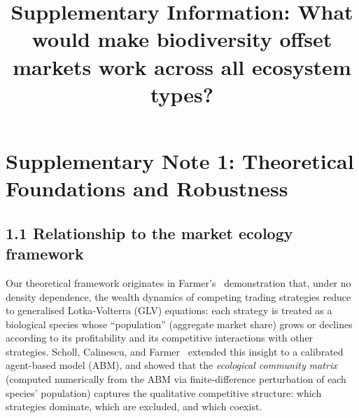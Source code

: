 \documentclass[pdflatex,sn-nature,oneside]{sn-jnl}
\begin{document}
\title{Supplementary Information: What would make biodiversity offset markets work
       across all ecosystem types?}

\author*[1]{ }


\maketitle



\section*{Supplementary Note 1: Theoretical Foundations and Robustness}

\subsection*{1.1 Relationship to the market ecology framework}

Our theoretical framework originates in Farmer's~\cite{Farmer2002} demonstration that, under no density dependence, the wealth dynamics of competing trading strategies reduce to generalised Lotka-Volterra (GLV) equations: each strategy is treated as a biological species whose ``population'' (aggregate market share) grows or declines according to its profitability and its competitive interactions with other strategies. Scholl, Calinescu, and Farmer~\cite{SchollCalinescuFarmer2021} extended this insight to a calibrated agent-based model (ABM), and showed that the \emph{ecological community matrix} (computed numerically from the ABM via finite-difference perturbation of each species' population) captures the qualitative competitive structure: which strategies dominate, which are excluded, and which coexist.
\end{document}
